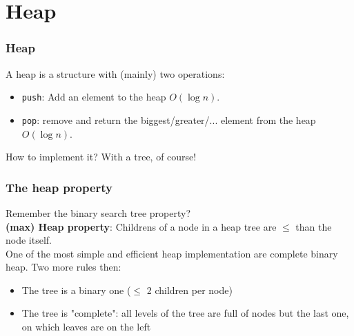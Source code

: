\section{Heap}

\begin{frame}
	\frametitle{Heap}
	A heap is a structure with (mainly) two operations:
	\begin{itemize}
		\item \texttt{push}: Add an element to the heap $O(\log n)$.
		\item \texttt{pop}: remove and return the biggest/greater/... element from the heap $O(\log n)$.
	\end{itemize}
	\pause How to implement it?
	\pause With a tree, of course!
\end{frame}

\begin{frame}
	\frametitle{The heap property}
	Remember the binary search tree property?\\
	\vspace{1cm}
	\textbf{(max) Heap property}: Childrens of a node in a heap tree are $\leq$ than the node itself.\\
	\vspace{1cm}
	One of the most simple and efficient heap implementation are complete binary heap. Two more rules then:
	\begin{itemize}
		\item The tree is a binary one ($\leq$ 2 children per node)
		\item The tree is "complete": all levels of the tree are full of nodes but the last one, on which leaves are on the left
	\end{itemize}
\end{frame}


